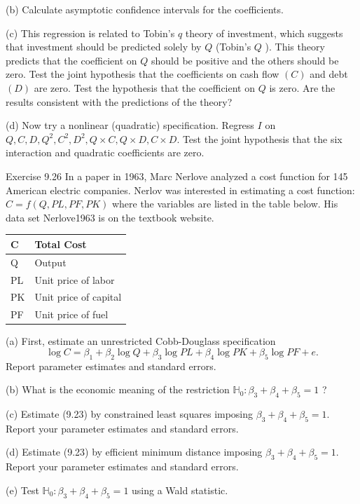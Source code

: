\documentclass[10pt]{article}
\begin{document}
(b) Calculate asymptotic confidence intervals for the coefficients.

(c) This regression is related to Tobin's $q$ theory of investment, which suggests that investment should be predicted solely by $Q$ (Tobin's $Q$ ). This theory predicts that the coefficient on $Q$ should be positive and the others should be zero. Test the joint hypothesis that the coefficients on cash flow $(C)$ and debt $(D)$ are zero. Test the hypothesis that the coefficient on $Q$ is zero. Are the results consistent with the predictions of the theory?

(d) Now try a nonlinear (quadratic) specification. Regress $I$ on $Q, C, D, Q^{2}, C^{2}, D^{2}, Q \times C, Q \times D, C \times D$. Test the joint hypothesis that the six interaction and quadratic coefficients are zero.

Exercise 9.26 In a paper in 1963, Marc Nerlove analyzed a cost function for 145 American electric companies. Nerlov was interested in estimating a cost function: $C=f(Q, P L, P F, P K)$ where the variables are listed in the table below. His data set Nerlove1963 is on the textbook website.

\begin{tabular}{|l|l|}
\hline
C & Total Cost \\
\hline
Q & Output \\
\hline
PL & Unit price of labor \\
\hline
PK & Unit price of capital \\
\hline
PF & Unit price of fuel \\
\hline
\end{tabular}

(a) First, estimate an unrestricted Cobb-Douglass specification
$$
\log C=\beta_{1}+\beta_{2} \log Q+\beta_{3} \log P L+\beta_{4} \log P K+\beta_{5} \log P F+e .
$$
Report parameter estimates and standard errors.

(b) What is the economic meaning of the restriction $\mathbb{H}_{0}: \beta_{3}+\beta_{4}+\beta_{5}=1$ ?

(c) Estimate (9.23) by constrained least squares imposing $\beta_{3}+\beta_{4}+\beta_{5}=1$. Report your parameter estimates and standard errors.

(d) Estimate (9.23) by efficient minimum distance imposing $\beta_{3}+\beta_{4}+\beta_{5}=1$. Report your parameter estimates and standard errors.

(e) Test $\mathbb{H}_{0}: \beta_{3}+\beta_{4}+\beta_{5}=1$ using a Wald statistic.
\end{document}

